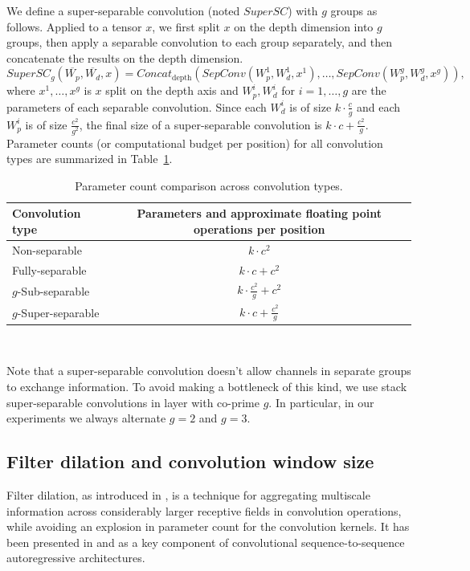 \documentclass{article}
\begin{document}
We define a super-separable convolution (noted $SuperSC$) with $g$ groups as follows. Applied to a tensor $x$, we first split $x$ on the depth dimension into $g$ groups, then apply a separable convolution to each group separately, and then concatenate the results on the depth dimension.
\[ SuperSC_g(\overline{W_p}, \overline{W_d}, x) =
   Concat_{\text{depth}}(SepConv(W_p^1, W_d^1, x^1), \dots, SepConv(W_p^g, W_d^g, x^g)), \]
where $x^1, \dots, x^g$ is $x$ split on the depth axis and $W_p^i, W_d^i$ for $i=1,\dots,g$ are the parameters of each separable convolution. Since each $W_d^i$ is of size $k \cdot \frac{c}{g}$ and each $W_p^i$ is of size $\frac{c^2}{g^2}$, the final size
of a super-separable convolution is $k \cdot c + \frac{c^2}{g}$.
Parameter counts (or computational budget per position) for all convolution types are summarized in Table~\ref{table:conv_compare}.

\begin{table}
  \centering
  \begin{tabular}{lc}
  \toprule
    Convolution type & Parameters and approximate floating point operations per position \\
  \midrule
    Non-separable       & $k \cdot c^2$ \\
    Fully-separable     & $k\cdot c + c^2$ \\
    $g$-Sub-separable   & $k \cdot \frac{c^2}{g} + c^2$ \\
    $g$-Super-separable & $k\cdot c + \frac{c^2}{g}$ \\
  \bottomrule
  \end{tabular} \\[4mm]
  \caption{Parameter count comparison across convolution types.}
  \label{table:conv_compare}
\end{table}


Note that a super-separable convolution doesn't allow channels in separate groups to exchange information.
To avoid making a bottleneck of this kind, we use stack super-separable convolutions in layer with co-prime $g$.
In particular, in our experiments we always alternate $g=2$ and $g=3$.

\subsection{Filter dilation and convolution window size}

Filter dilation, as introduced in \cite{dilatedconv2015}, is a technique for aggregating multiscale information across considerably larger receptive fields in convolution operations, while avoiding an explosion in parameter count for the convolution kernels. It has been presented in \cite{bytenet2016} and \cite{wavenet2016} as a key component of convolutional sequence-to-sequence autoregressive architectures.
\end{document}
